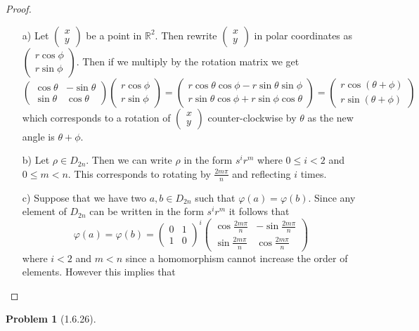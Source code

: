 \documentclass[10pt]{article}
\newcommand{\sk}{\vskip 10mm}
\newcommand{\bb}[1]{\mathbb{#1}}
\newcommand{\vc}[2]{\left(\begin{array}{cc} #1\\ #2\end{array}\right)}
\theoremstyle{plain}
\newtheorem{problem}{Problem}
\theoremstyle{remark}
\begin{document}
\begin{proof}
  \begin{itemize}
  \item[a)] Let $\vc{x}{y}$ be a point in $\bb{R}^2$. Then rewrite $\vc{x}{y}$ in
    polar coordinates as $\vc{r\cos\phi}{r\sin\phi}$. Then if we multiply by the
    rotation matrix we get
    \[
      \left(\begin{array}{cc}
        \cos\theta&-\sin\theta\\
        \sin\theta&\cos\theta
      \end{array}\right)
      \vc{r\cos\phi}{r\sin\phi}
      = \vc{r\cos\theta\cos\phi-r\sin\theta\sin\phi}{r\sin\theta\cos\phi+r\sin\phi\cos\theta}
      = \vc{r\cos(\theta+\phi)}{r\sin(\theta+\phi)}
    \]
    which corresponds to a rotation of $\vc{x}{y}$ counter-clockwise by $\theta$
    as the new angle is $\theta+\phi$.
  \item[b)] Let $\rho\in D_{2n}$. Then we can write $\rho$ in the form $s^ir^m$ where
    $0\leq i<2$ and $0\leq m < n$. This corresponds to rotating by $\frac{2m\pi}{n}$ and
    reflecting $i$ times. 
  \item[c)]
    Suppose that we have two $a,b\in D_{2n}$ such that $\varphi(a)=\varphi(b)$. Since any element
    of $D_{2n}$ can be written in the form $s^ir^m$ it follows that
    \[ \varphi(a)=\varphi(b)= \left(
        \begin{array}{cc}
          0&1\\
          1&0
        \end{array}
      \right)^i\left(
        \begin{array}{rr}
          \cos\frac{2m\pi}{n}&-\sin\frac{2m\pi}{n}\\
          \sin\frac{2m\pi}{n}&\cos\frac{2m\pi}{n}
        \end{array}
      \right)\]
    where $i<2$ and $m<n$ since a homomorphism cannot increase the order of elements.
    However this implies that $$
  \end{itemize}
\end{proof}

\sk

\begin{problem}[1.6.26]
  
\end{problem}
\end{document}
